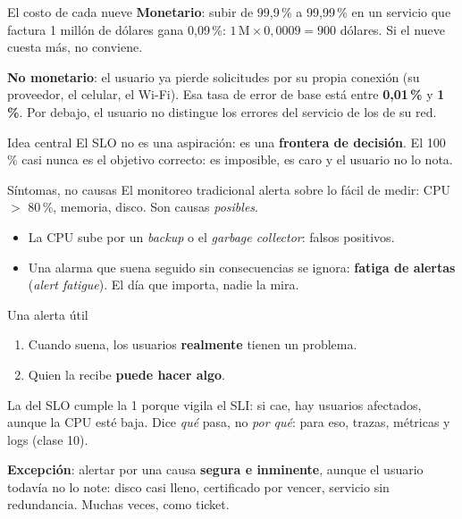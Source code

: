 \documentclass[institutional,screen,none]{ua-engineering-v6-beamer}
\begin{document}
\begin{frame}{El costo de cada nueve}
\textbf{Monetario}: subir de 99,9\,\% a 99,99\,\% en un servicio que factura 1 millón de dólares gana 0,09\,\%: $1\,\text{M} \times 0{,}0009 = 900$ dólares. Si el nueve cuesta más, no conviene.

\pause

\textbf{No monetario}: el usuario ya pierde solicitudes por su propia conexión (su proveedor, el celular, el Wi-Fi). Esa tasa de error de base está entre \textbf{0,01\,\%} y \textbf{1\,\%}. Por debajo, el usuario no distingue los errores del servicio de los de su red.

\pause

\begin{alertblock}{Idea central}
El SLO no es una aspiración: es una \textbf{frontera de decisión}. El 100\,\% casi nunca es el objetivo correcto: es imposible, es caro y el usuario no lo nota.
\end{alertblock}
\end{frame}


\begin{frame}{Síntomas, no causas}
El monitoreo tradicional alerta sobre lo fácil de medir: CPU $>$ 80\,\%, memoria, disco. Son causas \emph{posibles}.

\pause

\begin{itemize}\small
\item La CPU sube por un \emph{backup} o el \emph{garbage collector}: falsos positivos.
\item Una alarma que suena seguido sin consecuencias se ignora: \textbf{fatiga de alertas} (\emph{alert fatigue}). El día que importa, nadie la mira.
\end{itemize}

\pause

\begin{block}{Una alerta útil}
\begin{enumerate}\small
\item Cuando suena, los usuarios \textbf{realmente} tienen un problema.
\item Quien la recibe \textbf{puede hacer algo}.
\end{enumerate}
\end{block}

{\small La del SLO cumple la 1 porque vigila el SLI: si cae, hay usuarios afectados, aunque la CPU esté baja. Dice \emph{qué} pasa, no \emph{por qué}: para eso, trazas, métricas y logs (clase 10).}

\pause

{\small \textbf{Excepción}: alertar por una causa \textbf{segura e inminente}, aunque el usuario todavía no lo note: disco casi lleno, certificado por vencer, servicio sin redundancia. Muchas veces, como ticket.}
\end{frame}
\end{document}
